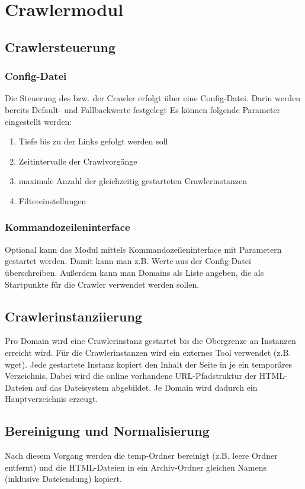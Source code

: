 \section{Crawlermodul}
\subsection{Crawlersteuerung} \label{l:spec:crawler:control}
	\subsubsection{Config-Datei} \label{l:spec:crawler:control:config} 
		Die Steuerung des bzw. der Crawler erfolgt über eine Config-Datei.
		Darin werden bereits Default- und Fallbackwerte festgelegt  
		Es können folgende Parameter eingestellt werden:
		\begin{enumerate}
			\item Tiefe bis zu der Links gefolgt werden soll
			\item Zeitintervalle der Crawlvorgänge
			\item maximale Anzahl der gleichzeitig gestarteten Crawlerinstanzen
			\item Filtereinstellungen
		\end{enumerate}

	\subsubsection{Kommandozeileninterface} \label{l:spec:crawler:control:cmd} 
		Optional kann das Modul mittels Kommandozeileninterface mit Parametern gestartet werden.
		Damit kann man z.B. Werte aus der Config-Datei überschreiben.
		Außerdem kann man Domains als Liste angeben, die als Startpunkte für die Crawler verwendet werden sollen. 
 
\subsection{Crawlerinstanziierung} \label{l:spec:crawler:instance}
	Pro Domain wird eine Crawlerinstanz gestartet bis die Obergrenze an Instanzen erreicht wird.
	Für die Crawlerinstanzen wird ein externes Tool verwendet (z.B. wget).
	Jede gestartete Instanz kopiert den Inhalt der Seite in je ein temporäres Verzeichnis.
	Dabei wird die online vorhandene URL-Pfadstruktur der HTML-Dateien auf das Dateisystem abgebildet.
	Je Domain wird dadurch ein Hauptverzeichnis erzeugt.
\subsection{Bereinigung und Normalisierung} \label{l:spec:crawler:normalize}
	Nach diesem Vorgang werden die temp-Ordner bereinigt (z.B. leere Ordner entfernt)
	und die HTML-Dateien in ein Archiv-Ordner gleichen Namens (inklusive Dateiendung) kopiert.
